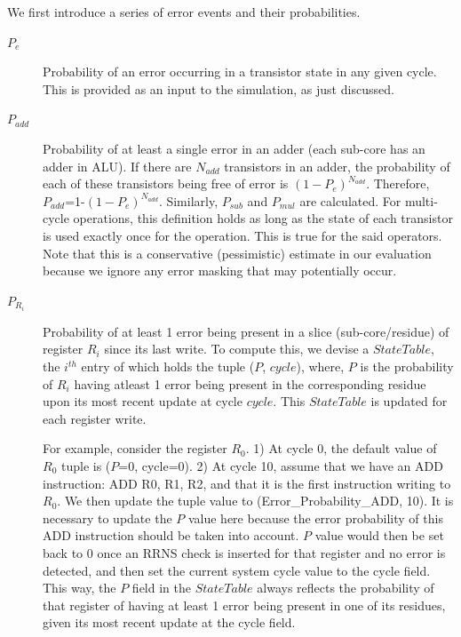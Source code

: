 \documentclass{sig-alternate}
\begin{document}
We first introduce a series of error events and their probabilities.
\begin{description}
\item[$P_e$] 
Probability of an error occurring in a transistor state in any given cycle. This is provided as an input to the simulation, as just discussed.

\item[$P_{add}$]
Probability of at least a single error in an adder (each sub-core has an adder in ALU). If there are $N_{add}$ transistors in an adder, the probability of each of these transistors being free of error is $(1-P_e)^{N_{add}}$. Therefore, $P_{add}$=1-$(1-P_e)^{N_{add}}$. Similarly, $P_{sub}$ and $P_{mul}$ are calculated. For multi-cycle operations, this definition holds as long as the state of each transistor is used exactly once for the operation. This is true for the said operators. Note that this is a conservative (pessimistic) estimate in our evaluation because we ignore any error masking that may potentially occur.


\item[$P_{R_i}$]
Probability of at least 1 error being present in a slice (sub-core/residue) of register $R_i$ since its last write. To compute this, we devise a $StateTable$, the $i^{th}$  entry of which holds the tuple ($P$, $cycle$), where, $P$ is the probability of $R_i$ having atleast 1 error being present in the corresponding residue upon its most recent update at cycle $cycle$. This $StateTable$ is updated for each register write. 

For example, consider the register $R_0$. 1) At cycle 0, the default value of $R_0$ tuple is ($P$=0, cycle=0). 2) At cycle 10, assume that we have an ADD instruction: ADD R0, R1, R2, and that it is the first instruction writing to $R_0$. We then update the tuple value to (Error\_Probability\_ADD, 10). It is necessary to update the $P$ value here because the error probability of this ADD instruction should be taken into account. $P$ value would then be set back to 0 once an RRNS check is inserted for that register and no error is detected, and then set the current system cycle value to the cycle field. This way, the $P$ field in the $StateTable$ always reflects the probability of that register of having at least 1 error being present in one of its residues, given its most recent update at the cycle field. 


\end{description}
\end{document}
